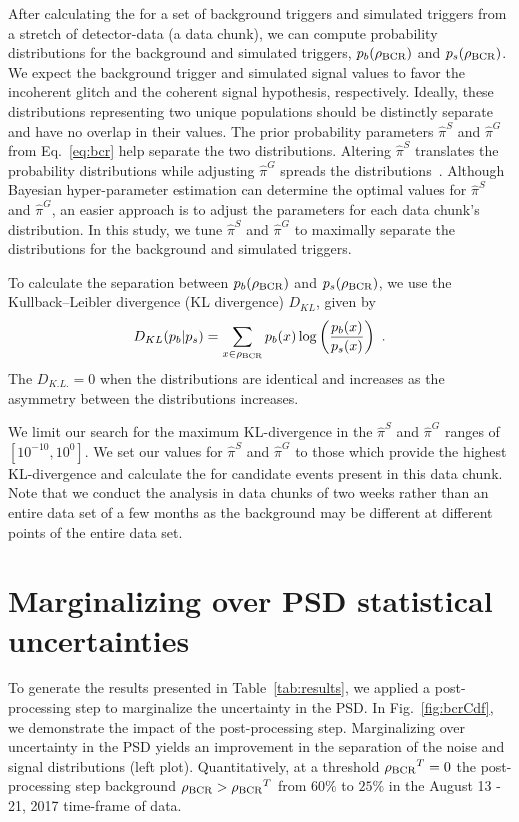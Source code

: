 \documentclass[useAMS,fleqn, usenatbib, final]{mnras}
\begin{document}
After calculating the \bcr for a set of background triggers and simulated triggers from a stretch of detector-data (a data chunk), we can compute probability distributions for the background and simulated triggers, $p_b(\bcr)$ and $p_s(\bcr)$. We expect the background trigger and simulated signal \bcr values to favor the incoherent glitch and the coherent signal hypothesis, respectively. Ideally, these distributions representing two unique populations should be distinctly separate and have no overlap in their \bcr values. The prior probability parameters $\hat{\pi}^S$ and $\hat{\pi}^G$ from Eq.~\ref{eq:bcr} help separate the two distributions. Altering $\hat{\pi}^S$ translates the \bcr probability distributions while adjusting $\hat{\pi}^G$ spreads the distributions~\citep[see][Appendix A]{BCR1}. Although Bayesian hyper-parameter estimation can determine the optimal values for $\hat{\pi}^S$ and $\hat{\pi}^G$, an easier approach is to adjust the parameters for each data chunk's \bcr distribution. In this study, we tune $\hat{\pi}^S$ and $\hat{\pi}^G$ to maximally separate the \bcr distributions for the background and simulated triggers. 

To calculate the separation between $p_b(\bcr)$ and $p_s(\bcr)$, we use the Kullback--Leibler divergence (KL divergence) $D_{KL}$, given by
\begin{equation}
    D_{KL}(p_b | p_s) = \sum\limits_{x\in \bcr} p_b(x) \log \left( \frac{p_b(x)}{p_s(x)} \right)  \ .
\end{equation}
The $D_{K.L.}=0$ when the distributions are identical and increases as the asymmetry between the distributions increases. 

We limit our search for the maximum KL-divergence in the $\hat{\pi}^S$ and $\hat{\pi}^G$ ranges of $[10^{-10}, 10^0]$. We set our values for $\hat{\pi}^S$ and $\hat{\pi}^G$ to those which provide the highest KL-divergence and calculate the \bcr for candidate events present in this data chunk. Note that we conduct the analysis in data chunks of two weeks rather than an entire data set of a few months as the background may be different at different points of the entire data set.



\section{Marginalizing over PSD statistical uncertainties}\label{sec:psd-marginalization}
To generate the results presented in Table~\ref{tab:results}, we applied a post-processing step to marginalize the uncertainty in the PSD. In Fig.~\ref{fig:bcrCdf}, we demonstrate the impact of the post-processing step. Marginalizing over uncertainty in the PSD yields an improvement in the separation of the noise and signal distributions (left plot). Quantitatively, at a threshold $\bcr^T=0$ the post-processing step  background $\bcr > \bcr^T$ from $60\%$ to $25\%$  in the August 13 - 21, 2017 time-frame of data. 
\end{document}
